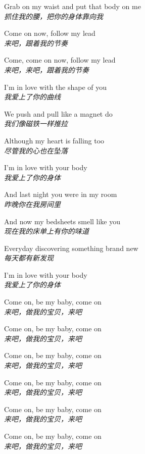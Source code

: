 \begin{spacing}{1.5}
\begin{flushleft}
Grab on my waist and put that body on me\\
\textit{抓住我的腰，把你的身体靠向我}\lyricspace

Come on now, follow my lead\\
\textit{来吧，跟着我的节奏}\lyricspace

Come, come on now, follow my lead\\
\textit{来吧，来吧，跟着我的节奏}\lyricspace

I'm in love with the shape of you\\
\textit{我爱上了你的曲线}\lyricspace

We push and pull like a magnet do\\
\textit{我们像磁铁一样推拉}\lyricspace

Although my heart is falling too\\
\textit{尽管我的心也在坠落}\lyricspace

I'm in love with your body\\
\textit{我爱上了你的身体}\lyricspace

And last night you were in my room\\
\textit{昨晚你在我房间里}\lyricspace

And now my bedsheets smell like you\\
\textit{现在我的床单上有你的味道}\lyricspace

Everyday discovering something brand new\\
\textit{每天都有新发现}\lyricspace

I'm in love with your body\\
\textit{我爱上了你的身体}\lyricspace

Come on, be my baby, come on\\
\textit{来吧，做我的宝贝，来吧}\lyricspace

Come on, be my baby, come on\\
\textit{来吧，做我的宝贝，来吧}\lyricspace

Come on, be my baby, come on\\
\textit{来吧，做我的宝贝，来吧}\lyricspace

Come on, be my baby, come on\\
\textit{来吧，做我的宝贝，来吧}\lyricspace

Come on, be my baby, come on\\
\textit{来吧，做我的宝贝，来吧}\lyricspace

Come on, be my baby, come on\\
\textit{来吧，做我的宝贝，来吧}\lyricspace


\end{flushleft}
\end{spacing}

